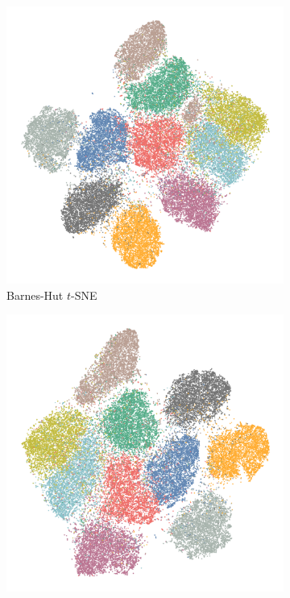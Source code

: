 \begin{appendix}
\begin{figure}[tbp]
  \centering
  \begin{subfigure}{0.45\linewidth}
    \centering
    \includegraphics[width=\linewidth]{img/emb/bhtsne_cifar}
    \caption{Barnes-Hut $t$-SNE}
  \end{subfigure}
\begin{subfigure}{0.45\linewidth}
  \centering
    \includegraphics[width=\linewidth]{img/emb/fitsne_cifar}

\end{subfigure}
\end{figure}
\end{appendix}
